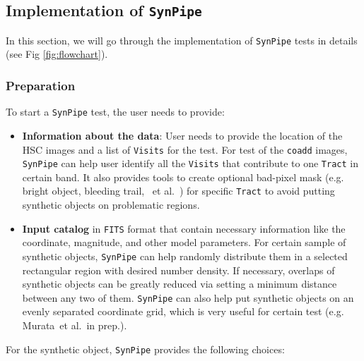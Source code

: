 \documentclass[useamsfonts]{pasj01}
\def\etal{{\ et al.~}}
\def\synpipe{\texttt{SynPipe}}
\def\tract{\texttt{Tract}}
\def\visits{\texttt{Visits}}
\begin{document}
\subsection{Implementation of \synpipe{}}
    \label{ssec:flowchart}

    In this section, we will go through the implementation of \synpipe{} tests in
    details (see Fig \ref{fig:flowchart}).

\subsubsection{Preparation}
    \label{sssec:prep}

    To start a \synpipe{} test, the user needs to provide:

    \begin{itemize}

        \item \textbf{Information about the data}: User needs to provide the
            location of the HSC images and a list of \visits{} for the
            test.
            For test of the \texttt{coadd} images, \synpipe{} can help user identify
            all the \visits{} that contribute to one \tract{} in certain
            band.
            It also provides tools to create optional bad-pixel mask (e.g. bright
            object, bleeding trail, \etal) for specific \tract{} to avoid
            putting synthetic objects on problematic regions.

        \item \textbf{Input catalog} in \texttt{FITS} format that contain necessary
            information like the coordinate, magnitude, and other model parameters.
            For certain sample of synthetic objects, \synpipe{} can help randomly
            distribute them in a selected rectangular region with desired number
            density.
            If necessary, overlaps of synthetic objects can be greatly reduced
            via setting a minimum distance between any two of them.
            \synpipe{} can also help put synthetic objects on an evenly separated
            coordinate grid, which is very useful for certain test
            (e.g. Murata\etal in prep.).

    \end{itemize}

    For the synthetic object, \synpipe{} provides the following choices:
\end{document}
